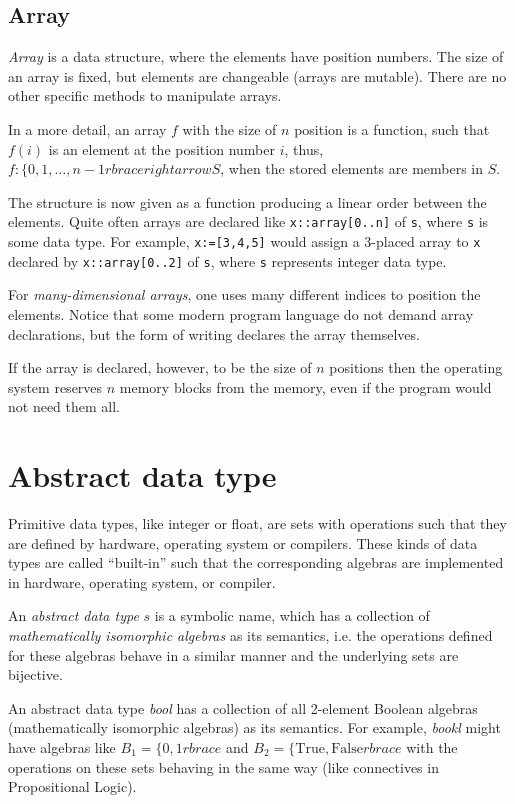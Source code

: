 \subsection{Array}
\emph{Array} is a data structure, where the elements have position numbers. The size of an array is fixed, but elements are changeable (arrays are mutable). There are no other specific methods to manipulate arrays.\par 
In a more detail, an array $f$ with the size of $n$ position is a function, such that $f(i)$ is an element at the position number $i$, thus, $f:\lbrace 0,1,\ldots ,n-1 rbrace rightarrow S$, when the stored elements are members in $S$.\par 
The structure is now given as a function producing a linear order between the elements. Quite often arrays are declared like \verb|x::array[0..n]| of \verb|s|, where \verb|s| is some data type. For example, \verb|x:=[3,4,5]| would assign a 3-placed array to \verb|x| declared by \verb|x::array[0..2]| of \verb|s|, where \verb|s| represents integer data type.\par 
For \emph{many-dimensional arrays}, one uses many different indices to position the elements. Notice that some modern program language do not demand array declarations, but the form of writing declares the array themselves.\par 
If the array is declared, however, to be the size of $n$ positions then the operating system reserves $n$ memory blocks from the memory, even if the program would not need them all.

\section{Abstract data type}
Primitive data types, like integer or float, are sets with operations such that they are defined by hardware, operating system or compilers. These kinds of data types are called ``built-in'' such that the corresponding algebras are implemented in hardware, operating system, or compiler.\par 
An \emph{abstract data type} $s$ is a symbolic name, which has a collection of \emph{mathematically isomorphic algebras} as its semantics, i.e. the operations defined for these algebras behave in a similar manner and the underlying sets are bijective.

\begin{example}
An abstract data type \emph{bool} has a collection of all 2-element Boolean algebras (mathematically isomorphic algebras) as its semantics. For example, \emph{bookl} might have algebras like $B_1=\lbrace 0,1 rbrace$ and $B_2=\lbrace \text{True},\text{False} rbrace$ with the operations on these sets behaving in the same way (like connectives in Propositional Logic).
\end{example}

